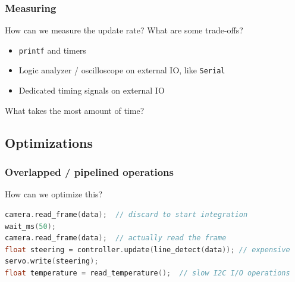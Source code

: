 \documentclass{beamer}
\begin{document}
\begin{frame}
\frametitle{Measuring}
How can we measure the update rate? What are some trade-offs? \\

 {
\begin{itemize}
  \item \texttt{printf} and timers
  \item Logic analyzer / oscilloscope on external IO, like \texttt{Serial}
  \item Dedicated timing signals on external IO
\end{itemize}
}

What takes the most amount of time?
\end{frame}


\subsection{Optimizations}
\begin{frame}[fragile]
\frametitle{Overlapped / pipelined operations}
How can we optimize this?
\begin{lstlisting}[language=C++,basicstyle=\ttfamily\scriptsize]
camera.read_frame(data);  // discard to start integration
wait_ms(50);
camera.read_frame(data);  // actually read the frame
float steering = controller.update(line_detect(data)); // expensive
servo.write(steering);
float temperature = read_temperature();  // slow I2C I/O operations
\end{lstlisting}
\end{frame}
\end{document}
